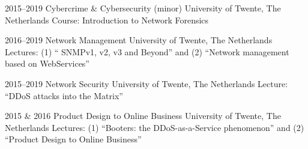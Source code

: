 \documentclass[print]{styles/friggeri-cv-mac} %
\begin{document}
\begin{entrylist}
\entry
{2015--2019}
{Cybercrime \& Cybersecurity (minor)}
{University of Twente, The Netherlands}
{Course: Introduction to Network Forensics\\
	} 

\entry
{2016--2019}
{Network Management}
{University of Twente, The Netherlands}
{Lectures: (1) `` SNMPv1, v2, v3 and Beyond'' and (2) ``Network management based
	on WebServices''\\
}


\entry
{2015--2019}
{Network Security}
{University of Twente, The Netherlands}
{Lecture: ``DDoS attacks into the Matrix''\\
}

\entry
{2015 \& 2016}
{Product Design to Online Business}
{University of Twente, The Netherlands}
{Lectures: (1) ``Booters: the DDoS-as-a-Service phenomenon'' and (2) ``Product
	Design to Online Business''
	}

\end{entrylist}
\end{document}
